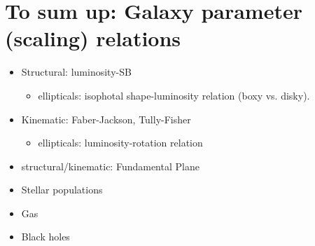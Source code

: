 \documentclass[12pt]{article}
\begin{document}
\section{To sum up: Galaxy parameter (scaling) relations}
    \begin{itemize}
      \item Structural: luminosity-SB
      \begin{itemize}
        \item ellipticals: isophotal shape-luminosity relation (boxy
        vs. disky).
      \end{itemize}
      \item Kinematic: Faber-Jackson, Tully-Fisher
      \begin{itemize}
        \item ellipticals: luminosity-rotation relation
      \end{itemize}
      \item structural/kinematic: Fundamental Plane
      \item Stellar populations
      \item Gas
      \item Black holes
    \end{itemize}

\end{document}
